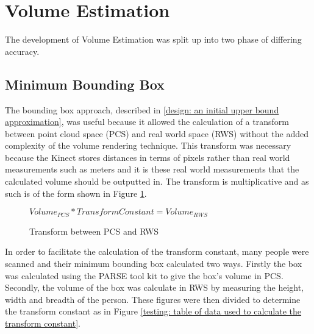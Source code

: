 \section{Volume Estimation}
\label{volume estimation}
The development of Volume Estimation was split up into two phase of differing accuracy.
\subsection{Minimum Bounding Box}
\label{testing: minimum bounding box}
The bounding box approach, described in \ref{design: an initial upper bound approximation}, was useful because it allowed the calculation of a transform between point cloud space (PCS) and real world space (RWS) without the added complexity of the volume rendering technique. This transform was necessary because the Kinect stores distances in terms of pixels rather than real world measurements such as meters and it is these real world measurements that the calculated volume should be outputted in. The transform is multiplicative and as such is of the form shown in Figure \ref{testing: transform between pcs and rws}.\\

\begin{figure}[h]
\begin{center}
$Volume_{PCS} * Transform Constant = Volume_{RWS}$
\end{center}
\caption{Transform between PCS and RWS}
\label{testing: transform between pcs and rws}
\end{figure}

In order to facilitate the calculation of the transform constant, many people were scanned and their minimum bounding box calculated two ways. Firstly the box was calculated using the PARSE tool kit to give the box's volume in PCS. Secondly, the volume of the box was calculate in RWS by measuring the height, width and breadth of the person. These figures were then divided to determine the transform constant as in Figure \ref{testing: table of data used to calculate the transform constant}.

